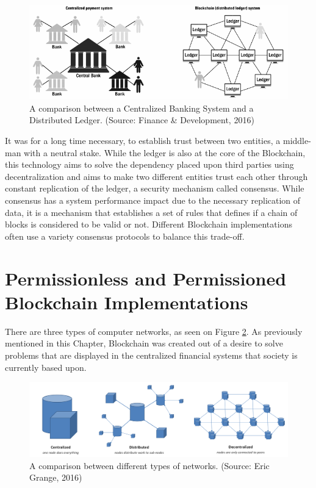 \begin{figure}[h]
  \centering
  \includegraphics[width=1\linewidth]{imgs/blockchainvscentralizedNetwork.png}
  \caption{\label{fig:centralizedvsdescentralized} A comparison between a
  Centralized Banking System and a Distributed Ledger. (Source: Finance \&
  Development, 2016)}
\end{figure}

It was for a long time necessary, to establish trust between two entities, a
middle-man with a neutral stake. While the ledger is also at the core of the
Blockchain, this technology aims to solve the dependency placed upon third
parties using decentralization and aims to make two different entities trust
each other through constant replication of the ledger, a security mechanism
called consensus.  While consensus has a system performance impact due to the
necessary replication of data, it is a mechanism that establishes a set of
rules that defines if a chain of blocks is considered to be valid or not.
Different Blockchain implementations often use a variety consensus protocols to
balance this trade-off.

\section{Permissionless and Permissioned Blockchain Implementations}


There are three types of computer networks, as seen on Figure
\ref{fig:typesofnetworks}. As previously mentioned in this Chapter, Blockchain
was created out of a desire to solve problems that are displayed in the
centralized financial systems that society is currently based upon.

\begin{figure}[h]
	\centering
	\includegraphics[width=1\linewidth]{imgs/typesofnetworks.png}
  \caption{\label{fig:typesofnetworks} A comparison between different types of
  networks. (Source: Eric Grange, 2016)}
\end{figure}

